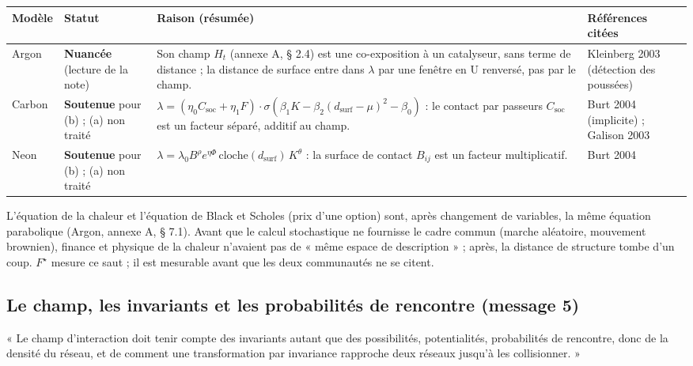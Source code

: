 \documentclass[a4paper,11pt]{article}
\makeatletter
\newenvironment{avis}{\small\renewcommand{\arraystretch}{1.15}%
\begin{longtable}{@{}>{\raggedright\arraybackslash}p{1.35cm}>{\raggedright\arraybackslash}p{2.45cm}>{\raggedright\arraybackslash}p{7.15cm}>{\raggedright\arraybackslash}p{4.4cm}@{}}
\toprule \textbf{Modèle} & \textbf{Statut} & \textbf{Raison (résumée)} & \textbf{Références citées}\\ \midrule \endhead
\bottomrule \endfoot}{\end{longtable}}
\newcommand{\st}[1]{\textbf{#1}}
\makeatother
\begin{document}
\begin{avis}
Argon & \st{Nuancée} (lecture de la note) & Son champ $H_t$ (annexe A, § 2.4) est une co-exposition à un catalyseur, sans terme de distance ; la distance de surface entre dans $\lambda$ par une fenêtre en U renversé, pas par le champ. & Kleinberg 2003 (détection des poussées)\\ \midrule
Carbon & \st{Soutenue} pour (b) ; (a) non traité & $\lambda=(\eta_0 C_{\text{soc}}+\eta_1F)\cdot\sigma(\beta_1K-\beta_2(d_{\text{surf}}-\mu)^2-\beta_0)$ : le contact par passeurs $C_{\text{soc}}$ est un facteur séparé, additif au champ. & Burt 2004 (implicite) ; Galison 2003\\ \midrule
Neon & \st{Soutenue} pour (b) ; (a) non traité & $\lambda=\lambda_0B^{\rho}e^{\eta\Phi}\,\mathrm{cloche}(d_{\text{surf}})\,K^{\theta}$ : la surface de contact $B_{ij}$ est un facteur multiplicatif. & Burt 2004\\
\end{avis}

\begin{exemple}
L'équation de la chaleur et l'équation de Black et Scholes (prix d'une option) sont, après changement de variables, la même équation parabolique (Argon, annexe A, § 7.1). Avant que le calcul stochastique ne fournisse le cadre commun (marche aléatoire, mouvement brownien), finance et physique de la chaleur n'avaient pas de « même espace de description » ; après, la distance de structure tombe d'un coup. $F^\star$ mesure ce saut ; il est mesurable avant que les deux communautés ne se citent.
\end{exemple}

\subsection{Le champ, les invariants et les probabilités de rencontre (message 5)}\label{sec:rencontres}
\begin{enonce}
« Le champ d'interaction doit tenir compte des invariants autant que des possibilités, potentialités, probabilités de rencontre, donc de la densité du réseau, et de comment une transformation par invariance rapproche deux réseaux jusqu'à les collisionner. »
\end{enonce}
\end{document}
